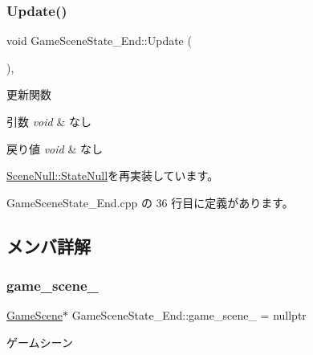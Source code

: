 \subsubsection{\texorpdfstring{Update()}{Update()}}
{\footnotesize\ttfamily void Game\+Scene\+State\+\_\+\+End\+::\+Update (\begin{DoxyParamCaption}{ }\end{DoxyParamCaption})\hspace{0.3cm}{\ttfamily [override]}, {\ttfamily [virtual]}}



更新関数 


\begin{DoxyParams}{引数}
{\em void} & なし \\
\hline
\end{DoxyParams}

\begin{DoxyRetVals}{戻り値}
{\em void} & なし \\
\hline
\end{DoxyRetVals}


\mbox{\hyperlink{class_scene_null_1_1_state_null_a835f82c22afb290eca79460450088baf}{Scene\+Null\+::\+State\+Null}}を再実装しています。



 Game\+Scene\+State\+\_\+\+End.\+cpp の 36 行目に定義があります。



\subsection{メンバ詳解}
\mbox{\label{class_game_scene_state___end_ac66be857d4985555528ccb7c3b7d9a2d}} 
\subsubsection{\texorpdfstring{game\+\_\+scene\+\_\+}{game\_scene\_}}
{\footnotesize\ttfamily \mbox{\hyperlink{class_game_scene}{Game\+Scene}}$\ast$ Game\+Scene\+State\+\_\+\+End\+::game\+\_\+scene\+\_\+ = nullptr\hspace{0.3cm}{\ttfamily [private]}}



ゲームシーン 



